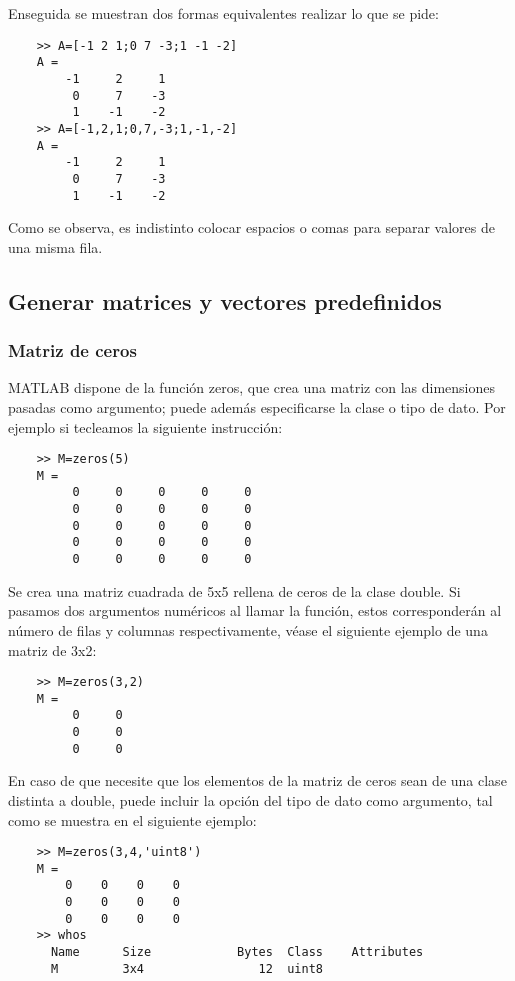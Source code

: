 Enseguida se muestran dos formas equivalentes realizar lo que se pide:

\begin{verbatim}
	>> A=[-1 2 1;0 7 -3;1 -1 -2]
	A =
	    -1     2     1
	     0     7    -3
	     1    -1    -2
	>> A=[-1,2,1;0,7,-3;1,-1,-2]
	A =
	    -1     2     1
	     0     7    -3
	     1    -1    -2
\end{verbatim}

Como se observa, es indistinto colocar espacios o comas para separar valores de una misma fila.

\subsection{Generar matrices y vectores predefinidos}

\subsubsection{Matriz de ceros}

MATLAB dispone de la función zeros, que crea una matriz con las dimensiones pasadas como argumento; 
puede además especificarse la clase o tipo de dato. Por ejemplo si tecleamos la siguiente instrucción:

\begin{verbatim}
	>> M=zeros(5)
	M =
	     0     0     0     0     0
	     0     0     0     0     0
	     0     0     0     0     0
	     0     0     0     0     0
	     0     0     0     0     0
\end{verbatim}

Se crea una matriz cuadrada de 5x5 rellena de ceros de la clase double. Si pasamos dos argumentos 
numéricos al llamar la función, estos corresponderán al número de filas y columnas respectivamente, 
véase el siguiente ejemplo de una matriz de 3x2:

\begin{verbatim}
	>> M=zeros(3,2)
	M =
	     0     0
	     0     0
	     0     0
\end{verbatim}

En caso de que necesite que los elementos de la matriz de ceros sean de una clase distinta a double, 
puede incluir la opción del tipo de dato como argumento, tal como se muestra en el siguiente ejemplo:

\begin{verbatim}
	>> M=zeros(3,4,'uint8')
	M =
	    0    0    0    0
	    0    0    0    0
	    0    0    0    0
	>> whos
	  Name      Size            Bytes  Class    Attributes
	  M         3x4                12  uint8              
\end{verbatim}

